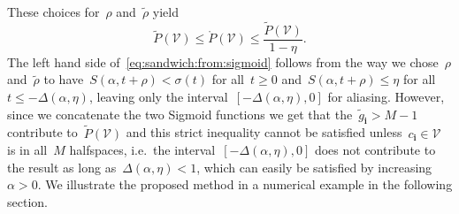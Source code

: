 \documentclass[letterpaper, 10pt, conference]{ieeeconf} %
\providecommand{\bfa}[1]{\mathbf{#1}}
\begin{document}
%
These choices for~$\rho$ and~$\tilde\rho$ yield
%
\begin{equation}\label{eq:sandwich:from:sigmoid}
	\tilde P(\mathcal V)\leq\mathring P(\mathcal V)\leq \frac{\tilde P(\mathcal V)}{1-\eta}.
\end{equation}
%
The left hand side of~\eqref{eq:sandwich:from:sigmoid} follows from the way we chose~$\rho$ and~$\tilde\rho$ to have~$S(\alpha,t+\rho)<\sigma(t)$ for all~$t\geq0$ and~$S(\alpha,t+\rho)\leq\eta$ for all~$t\leq -\Delta(\alpha,\eta)$, leaving only the interval~$[-\Delta(\alpha,\eta),0]$ for aliasing.
%
However, since we concatenate the two Sigmoid functions we get that the~$\tilde g_\bfa{i}>M-1$ contribute to~$\tilde P(\mathcal V)$ and this strict inequality cannot be satisfied unless~$c_\bfa{i}\in\mathcal V$ is in all~$M$ halfspaces, i.e.~the interval~$[-\Delta(\alpha,\eta),0]$ does not contribute to the result as long as~$\Delta(\alpha,\eta)<1$, which can easily be satisfied by increasing~$\alpha>0$.
%
We illustrate the proposed method in a numerical example in the following section.
\end{document}
